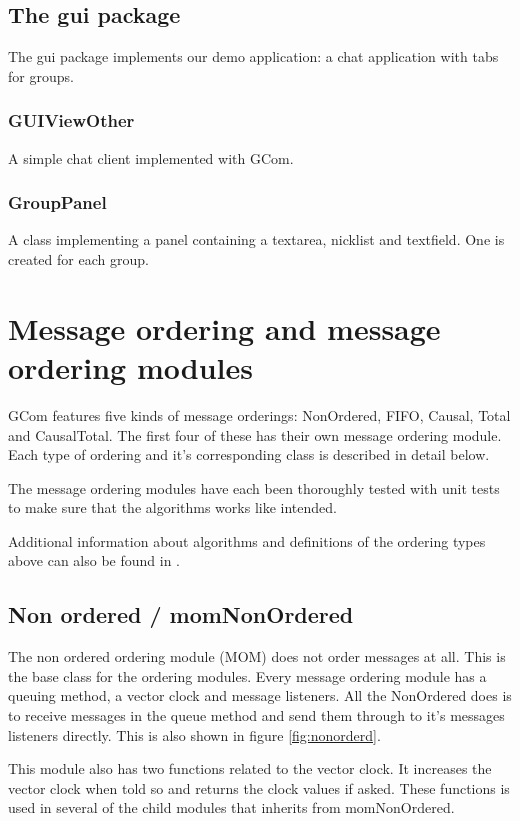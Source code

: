\documentclass[a4paper,english]{article}
\begin{document}
\subsection{The gui package}
The gui package implements our demo application: a chat application with tabs for groups. 

\subsubsection{GUIViewOther}
A simple chat client implemented with GCom.

\subsubsection{GroupPanel}
A class implementing a panel containing a textarea, nicklist and textfield. One is created for each group.


\section{Message ordering and message ordering modules}
\label{messageordering}
GCom features five kinds of message orderings: NonOrdered, FIFO, Causal, Total and CausalTotal. The first four of these has their own message ordering module. Each type of ordering and it's corresponding class is described in detail below.

The message ordering modules have each been thoroughly tested with unit tests to make sure that the algorithms works like intended.

Additional information about algorithms and definitions of the ordering types above can also be found in \cite{distsys-ordering}.

\subsection{Non ordered / momNonOrdered}
The non ordered ordering module (MOM) does not order messages at all. This is the base class for the ordering modules. Every message ordering module has a queuing method, a vector clock and message listeners. All the NonOrdered does is to receive messages in the queue method and send them through to it's messages listeners directly. This is also shown in figure \vref{fig:nonorderd}.

This module also has two functions related to the vector clock. It increases the vector clock when told so and returns the clock values if asked. These functions is used in several of the child modules that inherits from momNonOrdered.
\end{document}

